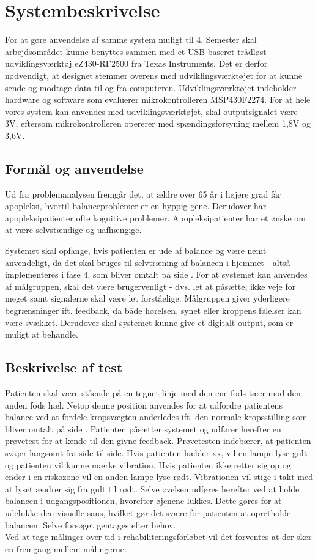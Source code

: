 \section{Systembeskrivelse}
For at gøre anvendelse af samme system muligt til 4. Semester skal arbejdsområdet kunne benyttes sammen med et USB-baseret trådløst udviklingsværktøj eZ430-RF2500 fra Texas Instruments. Det er derfor nødvendigt, at designet stemmer overens med udviklingsværktøjet for at kunne sende og modtage data til og fra computeren. Udviklingsværktøjet indeholder hardware og software som evaluerer mikrokontrolleren MSP430F2274. For at hele vores system kan anvendes med udviklingsværktøjet, skal outputsignalet være 3V, eftersom mikrokontrolleren opererer med spændingsforsyning mellem 1,8V og 3,6V.  

\subsection{Formål og anvendelse}
Ud fra problemanalysen fremgår det, at ældre over 65 år i højere grad får apopleksi, hvortil balanceproblemer er en hyppig gene. Derudover har apopleksipatienter ofte kognitive problemer. Apopleksipatienter har et ønske om at være selvstændige og uafhængige. 

Systemet skal opfange, hvis patienten er ude af balance og være nemt anvendeligt, da det skal bruges til selvtræning af balancen i hjemmet - altså implementeres i fase 4, som bliver omtalt på side \pageref{Faser}. For at systemet kan anvendes af målgruppen, skal det være brugervenligt - dvs. let at påsætte, ikke veje for meget samt signalerne skal være let forståelige. Målgruppen giver yderligere begrænsninger ift. feedback, da både hørelsen, synet eller kroppens følelser kan være svækket. Derudover skal systemet kunne give et digitalt output, som er muligt at behandle.


\subsection{Beskrivelse af test}
Patienten skal være stående på en tegnet linje med den ene fods tæer mod den anden fods hæl. Netop denne position anvendes for at udfordre patientens balance ved at fordele kropsvægten anderledes ift. den normale kropsstilling som bliver omtalt på side \pageref{BalanceAfsnit}. Patienten påsætter systemet og udfører herefter en prøvetest for at kende til den givne feedback. Prøvetesten indebærer, at patienten svajer langsomt fra side til side. Hvis patienten hælder xx, vil en lampe lyse gult og patienten vil kunne mærke vibration. Hvis patienten ikke retter sig op og ender i en riskozone vil en anden lampe lyse rødt. Vibrationen vil stige i takt med at lyset ændrer sig fra gult til rødt. Selve øvelsen udføres herefter ved at holde balancen i udgangspositionen, hvorefter øjenene lukkes. Dette gøres for at udelukke den visuelle sans, hvilket gør det svære for patienten at opretholde balancen. Selve forsøget gentages efter behov. \\
Ved at tage målinger over tid i rehabiliteringsforløbet vil det forventes at der sker en fremgang mellem målingerne. 

